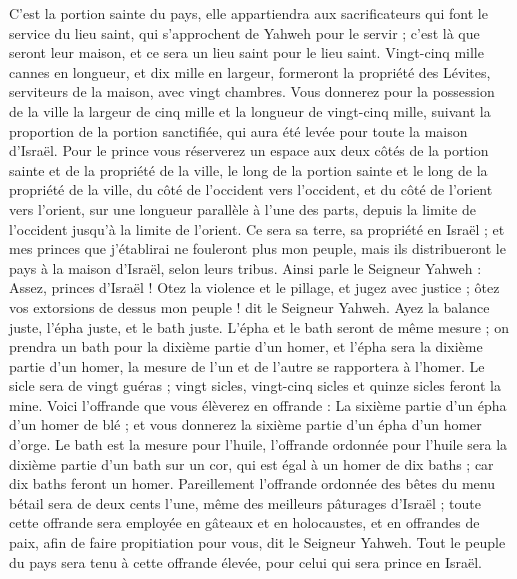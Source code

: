 \begin{multicols}{2}
C'est la portion sainte du pays, elle appartiendra aux sacrificateurs qui font le service du lieu saint, qui s'approchent de Yahweh pour le servir ; c'est là que seront leur maison, et ce sera un lieu saint pour le lieu saint.
Vingt-cinq mille cannes en longueur, et dix mille en largeur, formeront la propriété des Lévites, serviteurs de la maison, avec vingt chambres.
Vous donnerez pour la possession de la ville la largeur de cinq mille et la longueur de vingt-cinq mille, suivant la proportion de la portion sanctifiée, qui aura été levée pour toute la maison d'Israël.
Pour le prince vous réserverez un espace aux deux côtés de la portion sainte et de la propriété de la ville, le long de la portion sainte et le long de la propriété de la ville, du côté de l'occident vers l'occident, et du côté de l'orient vers l'orient, sur une longueur parallèle à l'une des parts, depuis la limite de l'occident jusqu'à la limite de l'orient.
Ce sera sa terre, sa propriété en Israël ; et mes princes que j'établirai ne fouleront plus mon peuple, mais ils distribueront le pays à la maison d'Israël, selon leurs tribus.
Ainsi parle le Seigneur Yahweh : Assez, princes d'Israël ! Otez la violence et le pillage, et jugez avec justice ; ôtez vos extorsions de dessus mon peuple ! dit le Seigneur Yahweh.
Ayez la balance juste, l'épha juste, et le bath juste.
L'épha et le bath seront de même mesure ; on prendra un bath pour la dixième partie d'un homer, et l'épha sera la dixième partie d'un homer, la mesure de l'un et de l'autre se rapportera à l'homer.
Le sicle sera de vingt guéras ; vingt sicles, vingt-cinq sicles et quinze sicles feront la mine.
Voici l'offrande que vous élèverez en offrande : La sixième partie d'un épha d'un homer de blé ; et vous donnerez la sixième partie d'un épha d'un homer d'orge.
Le bath est la mesure pour l'huile, l'offrande ordonnée pour l'huile sera la dixième partie d'un bath sur un cor, qui est égal à un homer de dix baths ; car dix baths feront un homer.
Pareillement l'offrande ordonnée des bêtes du menu bétail sera de deux cents l'une, même des meilleurs pâturages d'Israël ; toute cette offrande sera employée en gâteaux et en holocaustes, et en offrandes de paix, afin de faire propitiation pour vous, dit le Seigneur Yahweh.
Tout le peuple du pays sera tenu à cette offrande élevée, pour celui qui sera prince en Israël.

\end{multicols}
